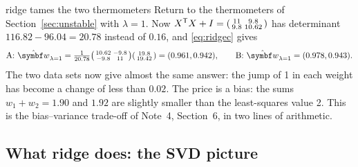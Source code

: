 \documentclass[11pt]{article}
\newcommand{\w}{\vect{w}}
\begin{document}
\begin{worked}{ridge tames the two thermometers}
Return to the thermometers of Section~\ref{sec:unstable} with $\lambda = 1$. Now $X^{\mathsf{T}} X + I = \begin{psmallmatrix} 11 & 9.8 \\ 9.8 &
10.62 \end{psmallmatrix}$ has determinant $116.82 - 96.04 = 20.78$ instead of $0.16$, and \eqref{eq:ridgec} gives
\[
  \text{A: } \hat{\w}_{\lambda = 1} = \tfrac{1}{20.78}\begin{psmallmatrix} 10.62 & -9.8 \\ -9.8 & 11 \end{psmallmatrix}
  \begin{psmallmatrix} 19.8 \\ 19.42 \end{psmallmatrix} = (0.961, 0.942), \qquad
  \text{B: } \hat{\w}_{\lambda = 1} = (0.978, 0.943) .
\]
The two data sets now give almost the same answer: the jump of 1 in each weight has become a change of less than $0.02$.
The price is a bias: the sums $w_1 + w_2 = 1.90$ and $1.92$ are slightly smaller than the least-squares value 2. This is
the bias--variance trade-off of Note~4, Section~6, in two lines of arithmetic.
\end{worked}

\subsection{What ridge does: the SVD picture}\label{sec:svd}
\end{document}
